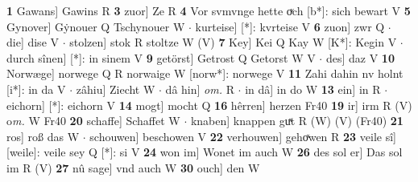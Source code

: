 \documentclass[8pt,a4paper,notitlepage]{article}
\begin{document}
\begin{table}[ht]
\begin{minipage}[t]{0.5\linewidth}
\textbf{1} Gawans] Gawins R \textbf{3} zuor] Ze R \textbf{4} Vor svmvnge hette oͮch [b*]: sich bewart V \textbf{5} Gynover] Gẏnouer Q Tschynouer W  $\cdot$ kurteise] [*]: kvrteise V \textbf{6} zuon] zwr Q  $\cdot$ die] dise V  $\cdot$ stolzen] stok R stoltze W (V) \textbf{7} Key] Kei Q Kay W [K*]: Kegin V  $\cdot$ durch sînen] [*]: in sinem V \textbf{9} getörst] Getrost Q Getorst W V  $\cdot$ des] daz V \textbf{10} Norwæge] norwege Q R norwaige W [norw*]: norwege V \textbf{11} Zahi dahin nv holnt [i*]: in da V  $\cdot$ zâhiu] Ziecht W  $\cdot$ dâ hin] \textit{om.} R  $\cdot$ in dâ] in do W \textbf{13} ein] in R  $\cdot$ eichorn] [*]: eichorn V \textbf{14} mogt] mocht Q \textbf{16} hêrren] herzen Fr40 \textbf{19} ir] irm R (V) o\textit{m. } W Fr40 \textbf{20} schaffe] Schaffet W  $\cdot$ knaben] knappen guͯt R (W) (V) (Fr40) \textbf{21} ros] roß das W  $\cdot$ schouwen] beschowen V \textbf{22} verhouwen] gehoͯwen R \textbf{23} veile sî] [weile]: veile sey Q [*]: si V \textbf{24} won im] Wonet im auch W \textbf{26} des sol er] Das sol im R (V) \textbf{27} nû sage] vnd auch W \textbf{30} ouch] den W \newline
\end{minipage}
\end{table}
\end{document}
